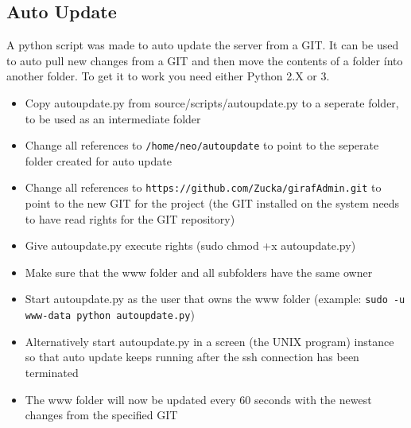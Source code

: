\subsection{Auto Update}
A python script was made to auto update the server from a GIT. It can be used to auto pull new changes from a GIT and then move the contents of a folder ínto another folder. To get it to work you need either Python 2.X or 3.
\begin{itemize}
\item Copy autoupdate.py from source/scripts/autoupdate.py to a seperate folder, to be used as an intermediate folder
\item Change all references to \texttt{/home/neo/autoupdate} to point to the seperate folder created for auto update
\item Change all references to \texttt{https://github.com/Zucka/girafAdmin.git} to point to the new GIT for the project (the GIT installed on the system needs to have read rights for the GIT repository)
\item Give autoupdate.py execute rights (sudo chmod +x autoupdate.py)
\item Make sure that the www folder and all subfolders have the same owner
\item Start autoupdate.py as the user that owns the www folder (example: \texttt{sudo -u www-data python autoupdate.py})
\item Alternatively start autoupdate.py in a screen (the UNIX program) instance so that auto update keeps running after the ssh connection has been terminated
\item The www folder will now be updated every 60 seconds with the newest changes from the specified GIT
\end{itemize}